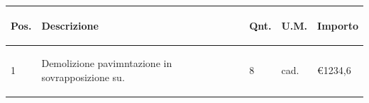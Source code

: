 \documentclass[a4paper]{article}
\begin{document}
  \noindent\begin{tabular}{ | L{10mm} |  L{86mm} | L{12mm} | L{12mm} | L{16mm} | }
  \hline
  \vspace{2.5mm}
  \begin{spacing}{0}
    \textbf{Pos.}
  \end{spacing} &
  \vspace{2.5mm}
  \begin{spacing}{0}
    \textbf{Descrizione}
  \end{spacing} &
  \vspace{2.5mm}
  \begin{spacing}{0}
    \textbf{Qnt.}
  \end{spacing} &
  \vspace{2.5mm}
  \begin{spacing}{0}
    \textbf{U.M.}
  \end{spacing} &
  \vspace{2.5mm}
  \begin{spacing}{0}
    \textbf{Importo}
  \end{spacing} \\
  \hline

  \vspace{2.5mm}
  \begin{spacing}{0}
    1
  \end{spacing} &
  \vspace{2.5mm}
  \begin{spacing}{0}
  Demolizione pavimntazione in sovrapposizione su.
  \end{spacing} &
  \vspace{2.5mm}
  \begin{spacing}{0}
    8
  \end{spacing} &
  \vspace{2.5mm}
  \begin{spacing}{0}
    cad.
  \end{spacing} &
  \vspace{2.5mm}
  \begin{spacing}{0}
    \euro\hfill 1234,6
  \end{spacing} \\
  \hline


\end{tabular}
\end{document}
